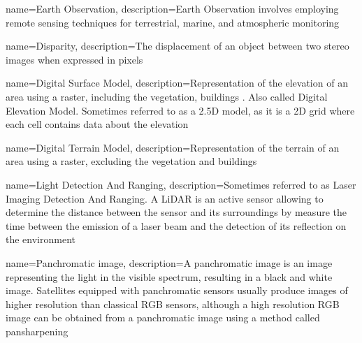 \makeglossaries
{}
{%
    name={Earth Observation},
    description={Earth Observation involves employing remote sensing techniques for terrestrial, marine, and atmospheric monitoring}
}

{%
    name={Disparity},
    description={The displacement of an object between two stereo images when expressed in pixels}
}

{%
    name=Digital Surface Model,
    description={Representation of the elevation of an area using a raster, including the vegetation, buildings \etc. Also called Digital Elevation Model. Sometimes referred to as a 2.5D model, as it is a 2D grid where each cell contains data about the elevation}
}

{%
    name={Digital Terrain Model},
    description={Representation of the terrain of an area using a raster, excluding the vegetation and buildings}
}

{%
    name={Light Detection And Ranging},
    description={Sometimes referred to as Laser Imaging Detection And Ranging. A LiDAR is an active sensor allowing to determine the distance between the sensor and its surroundings by measure the time between the emission of a laser beam and the detection of its reflection on the environment}
}

{%
    name={Panchromatic image},
    description={A panchromatic image is an image representing the light in the visible spectrum, resulting in a black and white image. Satellites equipped with panchromatic sensors usually produce images of higher resolution than classical RGB sensors, although a high resolution RGB image can be obtained from a panchromatic image using a method called pansharpening}
}
